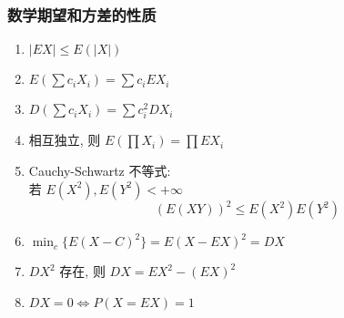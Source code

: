 \documentclass[11pt,a4paper,twocolumn]{article} %
\numberwithin{equation}{section} %
\begin{document}
\subsubsection{数学期望和方差的性质} %
\label{ssub:chara_expectation}
\begin{enumerate}
	\item $|EX|\le E(|X|)$
	\item $E(\sum c_i X_i) =  \sum c_i EX_i$
	\item $D(\sum c_i X_i) = \sum c_i^2 DX_i$
	\item 相互独立, 则 $E(\prod X_i) = \prod EX_i$
	\item Cauchy-Schwartz 不等式:\\
	若 $E(X^2), E(Y^2) < +\infty$
	\begin{equation}
		(E(XY))^2 \le E(X^2)E(Y^2)
	\end{equation}
	\item $\min_c\{E(X-C)^2\} = E(X - EX)^2 = DX$
	\item $DX^2$ 存在, 则 $DX = EX^2 - (EX)^2$
	\item $DX = 0 \Leftrightarrow P(X=EX) = 1$
\end{enumerate}
\end{document}
